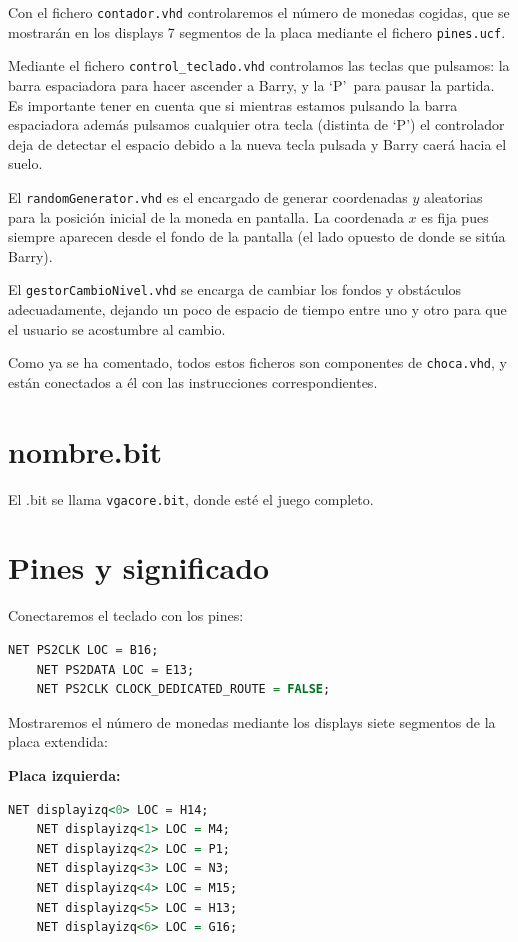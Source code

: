 \documentclass[11pt, a4paper, spanish, openright, twoside]{book}
\begin{document}
Con el fichero \texttt{contador.vhd} controlaremos el número de monedas cogidas, que se mostrarán en los displays 7 segmentos de la placa mediante el fichero \texttt{pines.ucf}.

Mediante el fichero \texttt{control\_teclado.vhd} controlamos las teclas que pulsamos: la barra espaciadora para hacer ascender a Barry, y la `P'\ para pausar la partida. Es importante tener en cuenta que si mientras estamos pulsando la barra espaciadora además pulsamos cualquier otra tecla (distinta de `P') el controlador deja de detectar el espacio debido a la nueva tecla pulsada y Barry caerá hacia el suelo.

El \texttt{randomGenerator.vhd} es el encargado de generar coordenadas $y$ aleatorias para la posición inicial de la moneda en pantalla. La coordenada $x$ es fija pues siempre aparecen desde el fondo de la pantalla (el lado opuesto de donde se sitúa Barry).

El \texttt{gestorCambioNivel.vhd}  se encarga de cambiar los fondos y obstáculos adecuadamente, dejando un poco de espacio de tiempo entre uno y otro para que el usuario se acostumbre al cambio. 

Como ya se ha comentado, todos estos ficheros son componentes de \texttt{choca.vhd}, y están conectados a él con las instrucciones correspondientes.

\section{nombre.bit}

El .bit se llama \texttt{vgacore.bit}, donde esté el juego completo.

\section{Pines y significado}
Conectaremos el teclado con los pines:

\begin{lstlisting}[language=VHDL]
	NET PS2CLK LOC = B16;
	NET PS2DATA LOC = E13;
	NET PS2CLK CLOCK_DEDICATED_ROUTE = FALSE;
\end{lstlisting}


Mostraremos el número de monedas mediante los displays siete segmentos de la placa extendida:

\textbf{Placa izquierda:}

\begin{lstlisting}[language=VHDL]
	NET displayizq<0> LOC = H14;
	NET displayizq<1> LOC = M4;
	NET displayizq<2> LOC = P1;
	NET displayizq<3> LOC = N3;
	NET displayizq<4> LOC = M15;
	NET displayizq<5> LOC = H13;
	NET displayizq<6> LOC = G16;
\end{lstlisting}
\end{document}

